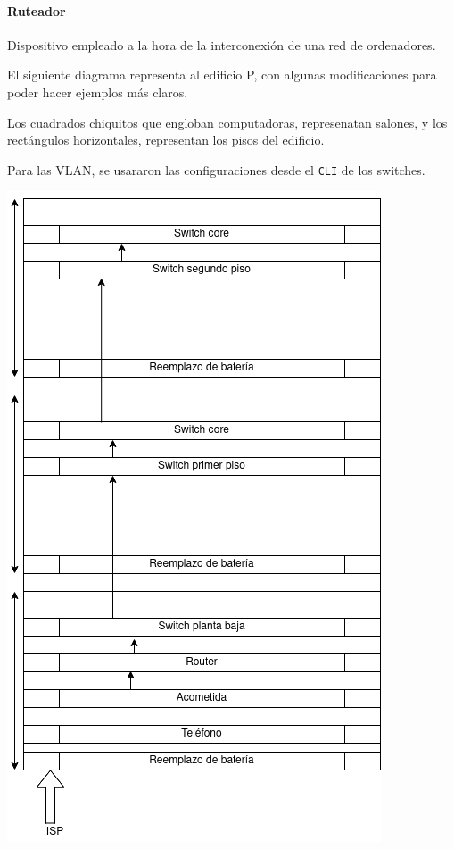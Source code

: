\documentclass[spanish,12pt,letterpaper]{article}
\begin{document}
\paragraph{Ruteador} Dispositivo empleado a la hora de la interconexión de una
red de ordenadores.

El siguiente diagrama representa al edificio P, con algunas modificaciones para
poder hacer ejemplos más claros.

Los cuadrados chiquitos que engloban computadoras, represenatan salones, y los
rectángulos horizontales, representan los pisos del edificio.

Para las VLAN, se usararon las configuraciones desde el \texttt{CLI} de los
switches.

\begin{center}
  \includegraphics[scale=.6]{rackP.png}
\end{center}
\end{document}

